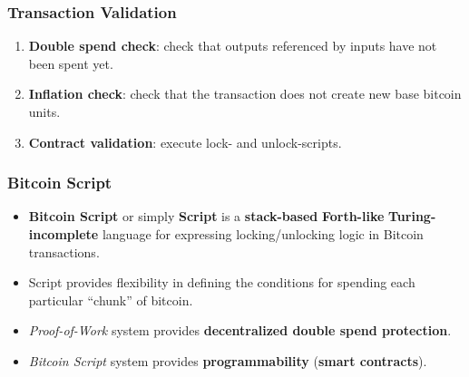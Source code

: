 \documentclass{beamer}
\begin{document}
\begin{frame}[fragile]
  \frametitle{Transaction Validation}
  \begin{enumerate}
  \item \textbf{Double spend check}: check that outputs referenced by inputs have not been spent yet.
  \item \textbf{Inflation check}: check that the transaction does not create new base bitcoin units.
  \item \textbf{Contract validation}: execute lock- and unlock-scripts.
  \end{enumerate}
\end{frame}

\begin{frame}[fragile]
  \frametitle{Bitcoin Script}
  \begin{itemize}
  \item \textbf{Bitcoin Script} or simply \textbf{Script} is a
    \textbf{stack-based} \textbf{Forth-like} \textbf{Turing-incomplete} language
    for expressing locking/unlocking logic in Bitcoin transactions.
  \item Script provides flexibility in defining the conditions for spending each
    particular ``chunk'' of bitcoin.
  \item \textit{Proof-of-Work} system provides \textbf{decentralized double
      spend protection}.
  \item \textit{Bitcoin Script} system provides \textbf{programmability}
    (\textbf{smart contracts}).
  \end{itemize}
\end{frame}
\end{document}
